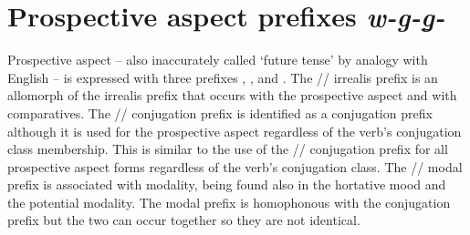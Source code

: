 \documentclass[12pt,letterpaper,landscape,oneside,article]{memoir}
\begin{document}
\section{Prospective aspect prefixes \textit{w-g-g̱-}}

\begin{multicols}{2}
Prospective aspect – also inaccurately called ‘future tense’ by analogy with English – is expressed with three prefixes , , and .
The  // irrealis prefix is an allomorph of the irrealis prefix that occurs with the prospective aspect and with comparatives.
The  // conjugation prefix is identified as a conjugation prefix although it is used for the prospective aspect regardless of the verb’s conjugation class membership.
This is similar to the use of the  // conjugation prefix for all prospective aspect forms regardless of the verb’s conjugation class.
The  // modal prefix is associated with modality, being found also in the hortative mood and the potential modality.
The  modal prefix is homophonous with the  conjugation prefix but the two can occur together so they are not identical.
\end{multicols}
\end{document}
